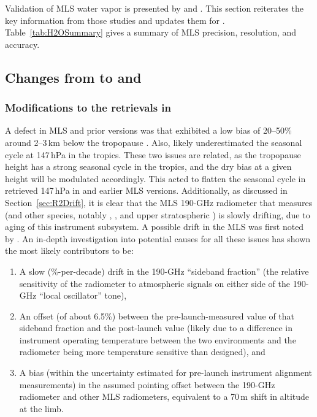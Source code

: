 Validation of MLS \vii water vapor is presented by \citet{ReadEtal:2007} and \citet{LambertEtal:2007}. This section reiterates the key information from those studies and updates them for \thisv. Table~\ref{tab:H2OSummary} gives a summary of MLS \thisv {} precision, resolution, and accuracy.

\subsection{Changes from \viv to \prevv and \thisv}
\label{sec:H2OChanges}

\subsubsection{Modifications to the  retrievals in \thisv}
\label{sec:H2ODriftDetails}

A defect in MLS \viv and prior versions was that  exhibited a low bias of 20--50\% around  2--3\,km below the tropopause \citep{ReadEtal:2022}. Also, \viv likely underestimated the  seasonal cycle at 147\,hPa in the tropics. These two issues are related, as the tropopause height has a strong seasonal cycle in the tropics, and the dry bias at a given height will be modulated accordingly. This acted to flatten the seasonal cycle in retrieved 147\,hPa  in \viv and earlier MLS versions. Additionally, as discussed in Section~\ref{sec:R2Drift}, it is clear that the MLS 190\nobreakdash-GHz radiometer that measures  (and other species, notably , , and upper stratospheric )  is slowly drifting, due to aging of this instrument subsystem. A possible drift in the MLS  was first noted by \citet{HurstEtal:2016}. An in-depth investigation into potential causes for all these issues \citep{LiveseyEtal:2021:Drifts} has shown the most likely contributors to be:
\begin{enumerate}
\item A slow (\%-per-decade) drift in the 190\nobreakdash-GHz ``sideband fraction'' (the relative sensitivity of the radiometer to atmospheric signals on either side of the 190\nobreakdash-GHz ``local oscillator'' tone),
\item An offset (of about 6.5\%) between the pre-launch-measured value of that sideband fraction and the post-launch value (likely due to a difference in instrument operating temperature between the two environments and the radiometer being more temperature sensitive than designed), and
\item A bias (within the uncertainty estimated for pre-launch instrument alignment measurements) in the assumed pointing offset between the 190\nobreakdash-GHz radiometer and other MLS radiometers, equivalent to a 70\,m shift in altitude at the limb.
\end{enumerate}

